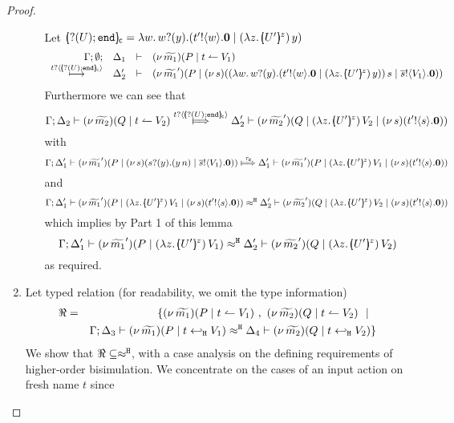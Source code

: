 \begin{proof}
\begin{enumerate}
\begin{enumerate}
							Let $\omapchar{\btinp{U} \tinact} = \abs{w}{ \binp{w}{y} ( \bout{t'}{w} \inact \Par \appl{(\abs{z}{\mapchar{U'}{z}})}{y} ) } $
							\[
								\mhorel{\Gamma}{\Delta_1}{\newsp{\widetilde{m_1}}{P \Par \ntrigger{t}{V_1}  } }
								{\hby{\bactinp{t}{\omapchar{\btinp{U} \tinact}}}}
								{\Delta_2'}{}{\newsp{\widetilde{m_1}'}{P \Par \newsp{s}{\appl{(\abs{w}{ \binp{w}{y} ( \bout{t'}{w} \inact \Par \appl{(\abs{z}{\mapchar{U'}{z}})}{y} ) })}{s} \Par \bout{\dual{s}}{V_1} \inact}}}
							\]
							Furthermore we can see that
							\[
								\horel{\Gamma}{\Delta_2}{\newsp{\widetilde{m_2}}{Q \Par \ntrigger{t}{V_2}  } }
								{\Hby{\bactinp{t}{\omapchar{\btinp{U} \tinact}}}}
								{\Delta_2'}{\newsp{\widetilde{m_2}'}{Q \Par \appl{(\abs{z}{\mapchar{U'}{z}})}{V_2} \Par \newsp{s}{\bout{t'}{s} \inact}}}
							\]
							with
							\[
								\horel{\Gamma}{\Delta_1'}{\newsp{\widetilde{m_1}'}{P \Par \newsp{s}{\binp{s}{y} (\appl{y}{n}) \Par \bout{\dual{s}}{V_1} \inact}}}
								{\Hby{\dtau}}
								{\Delta_1'}{\newsp{\widetilde{m_1}'}{P \Par \appl{(\abs{z}{\mapchar{U'}{z}})}{V_1} \Par \newsp{s}{\bout{t'}{s} \inact}}}
							\]
							and
							\[
								\horel{\Gamma}{\Delta_1'}{\newsp{\widetilde{m_1}'}{P \Par \appl{(\abs{z}{\mapchar{U'}{z}})}{V_1} \Par \newsp{s}{\bout{t'}{s} \inact}}}
								{\hwb}
								{\Delta_2'}{\newsp{\widetilde{m_2}'}{Q \Par \appl{(\abs{z}{\mapchar{U'}{z}})}{V_2} \Par \newsp{s}{\bout{t'}{s} \inact}}}
							\]
							which implies by Part 1 of this lemma
							\[
								\horel{\Gamma}{\Delta_1'}{\newsp{\widetilde{m_1}'}{P \Par \appl{(\abs{z}{\mapchar{U'}{z}})}{V_1}}}
								{\hwb}
								{\Delta_2'}{\newsp{\widetilde{m_2}'}{Q \Par \appl{(\abs{z}{\mapchar{U'}{z}})}{V_2}}}
							\]
							as required.
				\end{enumerate}
		\item
				Let typed relation (for readability, we omit the type information)
				\begin{eqnarray*}
		\Re &=&	\set{	\newsp{\widetilde{m_1}}{P \Par \ntrigger{t}{V_1}}\ ,\ 
									\newsp{\widetilde{m_2}}{Q \Par \ntrigger{t}{V_2}} \setbar\\
						&&
									\horel{\Gamma}{\Delta_3}{\newsp{\widetilde{m_1}}{P \Par \htrigger{t}{V_1}  } }
									{\hwb}
									{\Delta_4}{\newsp{\widetilde{m_2}}{Q \Par \htrigger{t}{V_2}  } }
					}
				\end{eqnarray*}
				We show that $\Re \subseteq \approx^\mathtt{H}$, with a case analysis on the defining requirements
				of higher-order bisimulation.
				We concentrate on the cases of an input action on fresh name $t$ since

\end{enumerate}
\end{proof}
